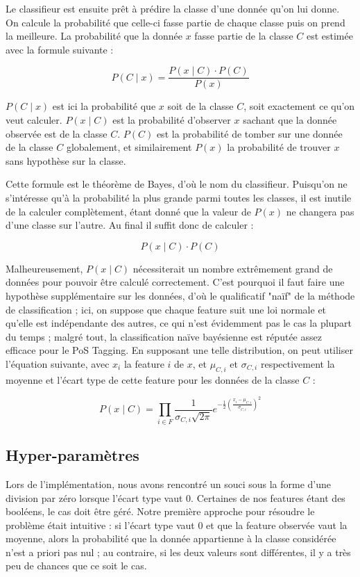 \documentclass[french, 14pt]{memoir}
\begin{document}
Le classifieur est ensuite prêt à prédire la classe d'une donnée qu'on lui donne. On calcule la probabilité que celle-ci fasse partie de chaque classe puis on prend la meilleure. La probabilité que la donnée $x$ fasse partie de la classe $C$ est estimée avec la formule suivante :

\begin{equation}
P(C \mid x) = \frac{P(x \mid C) \cdot P(C)}{P(x)}
\end{equation}

$P(C \mid x)$ est ici la probabilité que $x$ soit de la classe $C$, soit exactement ce qu'on veut calculer. $P(x \mid C)$ est la probabilité d'observer $x$ sachant que la donnée observée est de la classe $C$. $P(C)$ est la probabilité de tomber sur une donnée de la classe $C$ globalement, et similairement $P(x)$ la probabilité de trouver $x$ sans hypothèse sur la classe.

Cette formule est le théorème de Bayes, d'où le nom du classifieur. Puisqu'on ne s'intéresse qu'à la probabilité la plus grande parmi toutes les classes, il est inutile de la calculer complètement, étant donné que la valeur de $P(x)$ ne changera pas d'une classe sur l'autre. Au final il suffit donc de calculer :

\begin{equation}
P(x \mid C) \cdot P(C)
\end{equation}

Malheureusement, $P(x \mid C)$ nécessiterait un nombre extrêmement grand de données pour pouvoir être calculé correctement. C'est pourquoi il faut faire une hypothèse supplémentaire sur les données, d'où le qualificatif "naïf" de la méthode de classification ; ici, on suppose que chaque feature suit une loi normale et qu'elle est indépendante des autres, ce qui n'est évidemment pas le cas la plupart du temps ; malgré tout, la classification naïve bayésienne est réputée assez efficace pour le PoS Tagging. En supposant une telle distribution, on peut utiliser l'équation suivante, avec $x_i$ la feature $i$ de $x$, et $\mu_{C,i}$ et $\sigma_{C,i}$ respectivement la moyenne et l'écart type de cette feature pour les données de la classe $C$ :

\begin{equation}
P(x \mid C) = \prod _{i \in F} \frac{1}{\sigma_{C,i} \sqrt{2 \pi}} e^{-\frac {1} {2} (\frac {x_i - \mu_{C,i}} {\sigma_{C,i}})^2}
\end{equation}


\subsection{Hyper-paramètres}
Lors de l'implémentation, nous avons rencontré un souci sous la forme d'une division par zéro lorsque l'écart type vaut 0. Certaines de nos features étant des booléens, le cas doit être géré. Notre première approche pour résoudre le problème était intuitive : si l'écart type vaut 0 et que la feature observée vaut la moyenne, alors la probabilité que la donnée appartienne à la classe considérée n'est a priori pas nul ; au contraire, si les deux valeurs sont différentes, il y a très peu de chances que ce soit le cas.
\end{document}
